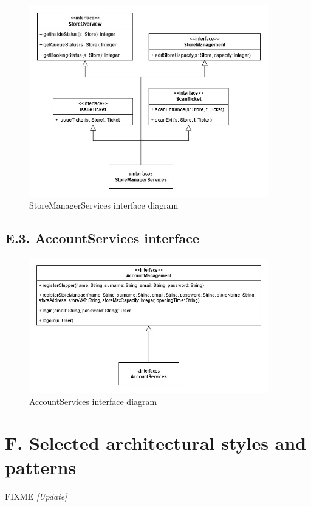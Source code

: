 \begin{figure}[H]
\centering
\includegraphics[width=0.93\textwidth]{component_interface_diagrams/store_manager_component_interface_diagram}
\caption{StoreManagerServices interface diagram}
\end{figure}

\subsection{E.3. AccountServices interface}

\begin{figure}[H]
\centering
\includegraphics[width=0.93\textwidth]{component_interface_diagrams/account_management_component_interface_diagram}
\caption{AccountServices interface diagram}
\end{figure}

\section{F. Selected architectural styles and patterns}
FIXME \emph{[Update]}

